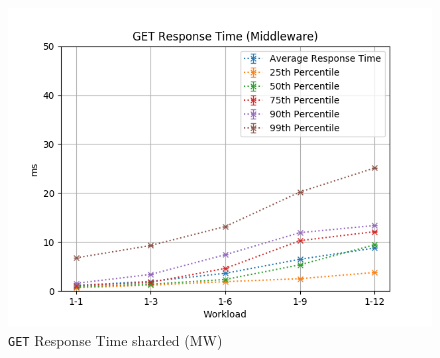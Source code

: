 \documentclass[11pt,a4paper]{article}
\begin{document}
\begin{figure}[H]
\begin{minipage}{0.5\textwidth}
        \includegraphics[width=\textwidth]{../illustrations/plots/4_1_full_system_read_sharded/64/middleware_get_rt_ms.png}
        \caption{\texttt{GET} Response Time sharded (MW)}
        \label{fig:full_system_read_sharded_mw_rt}
    \end{minipage}
\end{figure}
%
\end{document}
